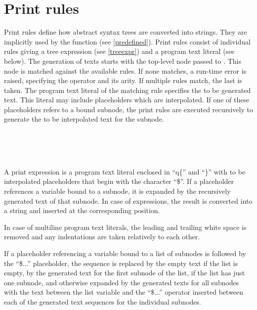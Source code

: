 \chapter{Print rules}\label{print}

Print rules define how abstract syntax trees are converted
into strings. They are implicitly used by the 
function (see \ref{predefined}). Print rules consist of
individual rules giving a tree expression (see \ref{treeexpr})
and a program text literal (see below). The generation of
texts starts with the top-level node passed to .
This node is matched against the available rules. If none matches,
a run-time error is raised, specifying the operator and its arity.
If multiple rules match, the last is taken. The program text
literal of the matching rule specifies the to be generated text.
This literal may include placeholders which are interpolated.
If one of these placeholders refers to a bound subnode, the
print rules are executed recursively to generate the to be
interpolated text for the subnode.

\begin{grammar}
      \produces {} 
	 \lextoken{\{} 
	 \lextoken{\}} \\
      \produces {} \\
      \produces {}
	  \\
      \produces {}
	 \lextoken{->}  \lextoken{;}
\end{grammar}

\noindent
A print expression is a program text literal enclosed in ``q\{'' and
``\}'' with to be interpolated placeholders that begin with the character
``\$''.  If a placeholder references a variable bound to a subnode, it
is expanded by the recursively generated text of that subnode.  In case
of expressions, the result is converted into a string and inserted at
the corresponding position.

In case of multiline program text literals, the leading and trailing
white space is removed and any indentations are taken relatively to
each other.

If a placeholder referencing a variable bound to a list of 
subnodes is followed by the ``\$...'' placeholder, the
sequence is replaced by the empty text if the list is empty,
by the generated text for the first subnode of the list, if
the list has just one subnode, and otherwise expanded
by the generated texts for all subnodes with the text between
the list variable and the ``\$...'' operator inserted between
each of the generated text sequences for the individual subnodes.

